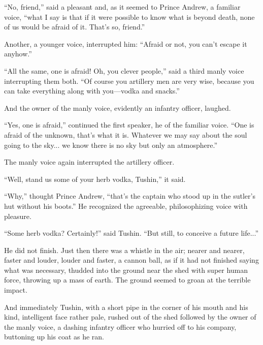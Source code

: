 ``No, friend,'' said a pleasant and, as it seemed to Prince
Andrew, a familiar voice, ``what I say is that if it were
possible to know what is beyond death, none of us would be afraid
of it. That's so, friend.''

Another, a younger voice, interrupted him: ``Afraid or not, you
can't escape it anyhow.''

``All the same, one is afraid! Oh, you clever people,'' said a
third manly voice interrupting them both. ``Of course you
artillery men are very wise, because you can take everything
along with you---vodka and snacks.''

And the owner of the manly voice, evidently an infantry officer,
laughed.

``Yes, one is afraid,'' continued the first speaker, he of the
familiar voice. ``One is afraid of the unknown, that's what it
is. Whatever we may say about the soul going to the sky... we
know there is no sky but only an atmosphere.''

The manly voice again interrupted the artillery officer.

``Well, stand us some of your herb vodka, Tushin,'' it said.

``Why,'' thought Prince Andrew, ``that's the captain who stood up
in the sutler's hut without his boots.'' He recognized the
agreeable, philosophizing voice with pleasure.

``Some herb vodka? Certainly!'' said Tushin. ``But still, to
conceive a future life...''

He did not finish. Just then there was a whistle in the air;
nearer and nearer, faster and louder, louder and faster, a cannon
ball, as if it had not finished saying what was necessary,
thudded into the ground near the shed with super human force,
throwing up a mass of earth. The ground seemed to groan at the
terrible impact.

And immediately Tushin, with a short pipe in the corner of his
mouth and his kind, intelligent face rather pale, rushed out of
the shed followed by the owner of the manly voice, a dashing
infantry officer who hurried off to his company, buttoning up his
coat as he ran.


